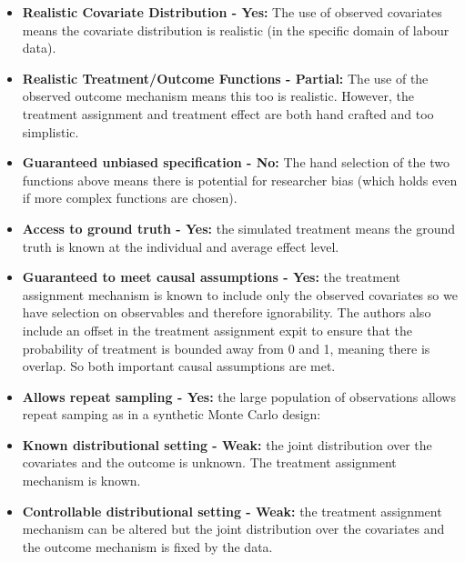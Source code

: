 \documentclass[../main.tex]{subfiles}
\begin{document}
\vspace{\baselineskip}
\begin{itemize}
	\item \textbf{Realistic Covariate Distribution - Yes: }The use of observed covariates means the covariate distribution is realistic (in the specific domain of labour data).\par


\vspace{\baselineskip}
	\item \textbf{Realistic Treatment/Outcome Functions - Partial: }The use of the observed outcome mechanism means this too is realistic. However, the treatment assignment and treatment effect are both hand crafted and too simplistic.\par


\vspace{\baselineskip}
	\item \textbf{Guaranteed unbiased specification - No: }The hand selection of the two functions above means there is potential for researcher bias (which holds even if more complex functions are chosen).\par


\vspace{\baselineskip}
	\item \textbf{Access to ground truth - Yes: }the simulated treatment means the ground truth is known at the individual and average effect level.\par


\vspace{\baselineskip}
	\item \textbf{Guaranteed to meet causal assumptions - Yes: }the treatment assignment mechanism is known to include only the observed covariates so we have selection on observables and therefore ignorability. The authors also include an offset in the treatment assignment expit to ensure that the probability of treatment is bounded away from 0 and 1, meaning there is overlap. So both important causal assumptions are met.\par


\vspace{\baselineskip}
	\item \textbf{Allows repeat sampling - Yes: }the large population of observations allows repeat samping as in a synthetic Monte Carlo design:\par


\vspace{\baselineskip}
	\item \textbf{Known distributional setting - Weak: }the joint distribution over the covariates and the outcome is unknown. The treatment assignment mechanism is known.\par


\vspace{\baselineskip}
	\item \textbf{Controllable distributional setting - Weak: }the treatment assignment mechanism can be altered but the joint distribution over the covariates and the outcome mechanism is fixed by the data.
\end{itemize}\par
\end{document}
